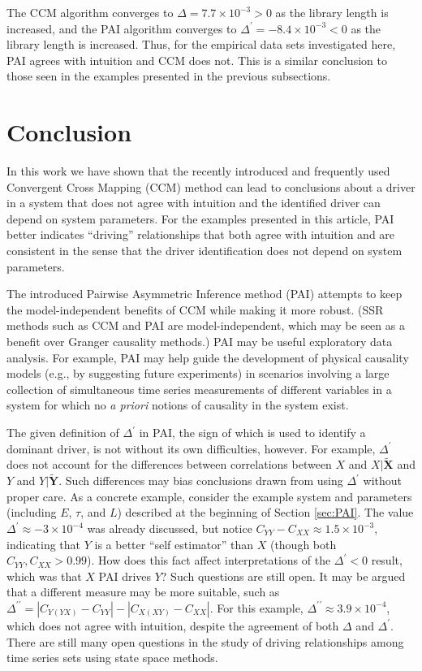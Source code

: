 \documentclass[twocolumn,aps,pre,groupedaddress]{revtex4-1}
\begin{document}
The CCM algorithm converges to $\Delta = 7.7\times10^{-3} > 0$ as the library length is increased, and the PAI algorithm converges to $\Delta^\prime = -8.4\times10^{-3} < 0$ as the library length is increased.  Thus, for the empirical data sets investigated here, PAI agrees with intuition and CCM does not.  This is a similar conclusion to those seen in the examples presented in the previous subsections.

\section{Conclusion}
In this work we have shown that the recently introduced and frequently used Convergent Cross Mapping (CCM) method can lead to conclusions about a driver in a system that does not agree with intuition and the identified driver can depend on system parameters.  For the examples presented in this article, PAI better indicates ``driving'' relationships that both agree with intuition and are consistent in the sense that the driver identification does not depend on system parameters.  

The introduced Pairwise Asymmetric Inference method (PAI) attempts to keep the model-independent benefits of CCM while making it more robust. (SSR methods such as CCM and PAI are model-independent, which may be seen as a benefit over Granger causality methods.) PAI may be useful exploratory data analysis.  For example, PAI may help guide the development of physical causality models (e.g., by suggesting future experiments) in scenarios involving a large collection of simultaneous time series measurements of different variables in a system for which no {\em a priori} notions of causality in the system exist. 

The given definition of $\Delta^\prime$ in PAI, the sign of which is used to identify a dominant driver, is not without its own difficulties, however.  For example, $\Delta^\prime$ does not account for the differences between correlations between $X$ and $X|\tilde{\mathbf{X}}$ and $Y$ and $Y|\tilde{\mathbf{Y}}$.  Such differences may bias conclusions drawn from using $\Delta^\prime$ without proper care.  As a concrete example, consider the example system and parameters (including $E$, $\tau$, and $L$) described at the beginning of Section \ref{sec:PAI}.  The value $\Delta^\prime \approx -3\times 10^{-4}$ was already discussed, but notice $C_{YY}-C_{XX} \approx 1.5\times10^{-3}$, indicating that $Y$ is a better ``self estimator'' than $X$ (though both $C_{YY},C_{XX}>0.99$).  How does this fact affect interpretations of the $\Delta^\prime<0$ result, which was that $X$ PAI drives $Y$?  Such questions are still open.  It may be argued that a different measure may be more suitable, such as $\Delta^{\prime\prime} = |C_{Y(YX)}-C_{YY}|-|C_{X(XY)}-C_{XX}|$.  For this example, $\Delta^{\prime\prime} \approx 3.9\times 10^{-4}$, which does not agree with intuition, despite the agreement of both $\Delta$ and $\Delta^\prime$.  There are still many open questions in the study of driving relationships among time series sets using state space methods.
\end{document}
